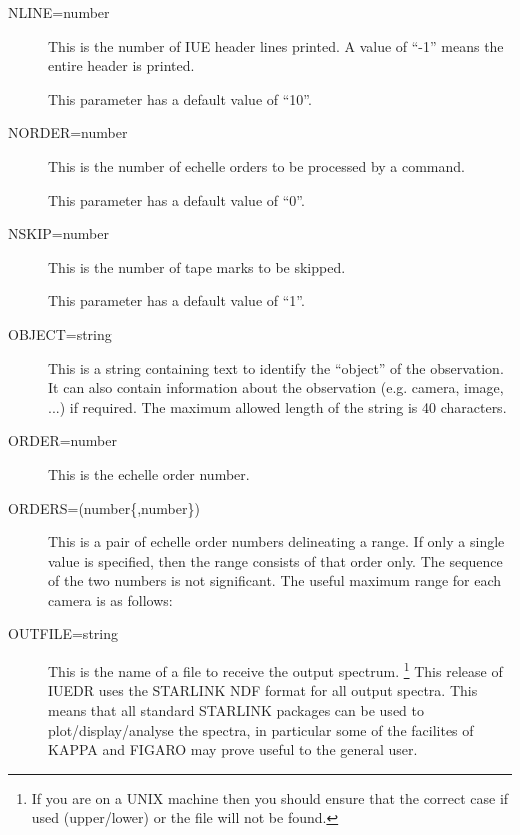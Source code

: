 \begin {description}
\item [NLINE=number]
This is the number of IUE header lines printed.
A value of ``-1'' means the entire header is printed.

This parameter has a default value of ``10''.

\item [NORDER=number]
This is the number of echelle orders to be processed by a command.

This parameter has a default value of ``0''.

\item [NSKIP=number]
This is the number of tape marks to be skipped.

This parameter has a default value of ``1''.

\item [OBJECT=string]
This is a string containing text to identify the ``object'' of the
observation.
It can also contain information about the observation
(e.g. camera, image, ...) if required.
The maximum allowed length of the string is 40 characters.

\item [ORDER=number]
This is the echelle order number.

\item [ORDERS=(number\{,number\})]
This is a pair of echelle order numbers delineating a range.
If only a single value is specified, then the range consists of that
order only.
The sequence of the two numbers is not significant.
The useful maximum range for each camera is as follows:

\begin {quote}
\end {quote}

\item [OUTFILE=string]
This is the name of a file to receive the output spectrum.
\footnote{If you are on a UNIX machine then you should ensure that the
correct case if used (upper/lower) or the file will not be found.}
This release of IUEDR uses the STARLINK NDF format for all output
spectra. This means that all standard STARLINK packages can be used
to plot/display/analyse the spectra, in particular some of the
facilites of KAPPA and FIGARO may prove useful to the general user.


\end{description}
